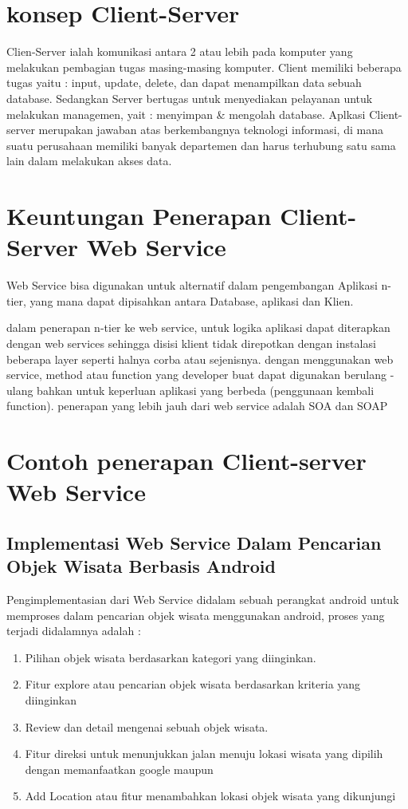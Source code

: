{\section{konsep Client-Server}
Clien-Server ialah komunikasi antara 2 atau lebih pada komputer yang melakukan pembagian tugas masing-masing komputer. Client memiliki beberapa tugas yaitu : input, update, delete, dan dapat menampilkan data sebuah database. Sedangkan Server bertugas untuk menyediakan pelayanan untuk melakukan managemen, yait : menyimpan & mengolah database. Aplkasi Client-server merupakan jawaban atas berkembangnya teknologi informasi, di mana suatu perusahaan memiliki banyak departemen dan harus terhubung satu sama lain dalam melakukan akses data.

\section{Keuntungan Penerapan Client-Server Web Service}
Web Service bisa digunakan untuk alternatif dalam pengembangan Aplikasi n-tier, yang mana dapat dipisahkan
antara Database, aplikasi dan Klien. 

dalam penerapan n-tier ke web service, untuk logika aplikasi dapat diterapkan dengan web services
sehingga disisi klient tidak direpotkan dengan instalasi beberapa layer seperti halnya corba atau sejenisnya.
dengan menggunakan web service, method atau function yang developer buat dapat digunakan berulang - ulang bahkan
untuk keperluan aplikasi yang berbeda (penggunaan kembali function). penerapan yang lebih jauh dari web service adalah SOA dan SOAP

\section{Contoh penerapan Client-server Web Service}
\subsection{Implementasi Web Service Dalam Pencarian Objek Wisata Berbasis Android}
Pengimplementasian dari Web Service didalam sebuah perangkat android untuk memproses
dalam pencarian objek wisata menggunakan android, proses yang terjadi didalamnya adalah :

\begin{enumerate}
    \item Pilihan objek wisata berdasarkan kategori yang diinginkan.
    \item Fitur explore atau pencarian objek wisata berdasarkan kriteria yang diinginkan
    \item Review dan detail mengenai sebuah objek wisata.
    \item Fitur direksi untuk menunjukkan jalan menuju lokasi wisata yang dipilih dengan memanfaatkan google maupun
    \item Add Location atau fitur menambahkan lokasi objek wisata yang dikunjungi
\end{enumerate}

}

